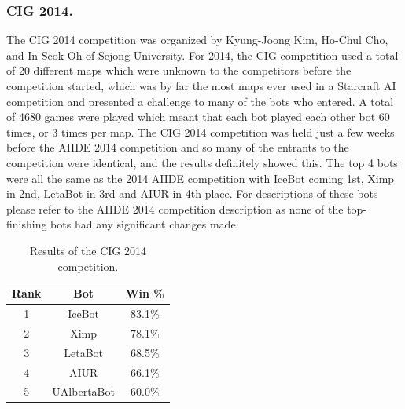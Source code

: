 \documentclass{llncs}
\begin{document}
\subsubsection*{CIG 2014.}
The CIG 2014 competition was organized by Kyung-Joong Kim, Ho-Chul Cho, and In-Seok Oh of Sejong University. For 2014, the CIG competition used a total of 20 different maps which were unknown to the competitors before the competition started, which was by far the most maps ever used in a Starcraft AI competition and presented a challenge to many of the bots who entered. A total of 4680 games were played which meant that each bot played each other bot 60 times, or 3 times per map. The CIG 2014 competition was held just a few weeks before the AIIDE 2014 competition and so many of the entrants to the competition were identical, and the results definitely showed this. The top 4 bots were all the same as the 2014 AIIDE competition with IceBot coming 1st, Ximp in 2nd, LetaBot in 3rd and AIUR in 4th place. For descriptions of these bots please refer to the AIIDE 2014 competition description as none of the top-finishing bots had any significant changes made.

\begin{table}[t]
\caption{Results of the CIG 2014 competition.}
\label{tab:cig2014}
\centering
\begin{tabular}{|c|c|c|}
\hline
{\bfseries Rank} & {\bfseries Bot} & {\bfseries Win \%} \\
\hline
1 & IceBot & 83.1\% \\
2 & Ximp & 78.1\% \\
3 & LetaBot & 68.5\% \\
4 & AIUR & 66.1\% \\
5 & UAlbertaBot & 60.0\% \\ 
\hline
\end{tabular}
\end{table}
\end{document}
